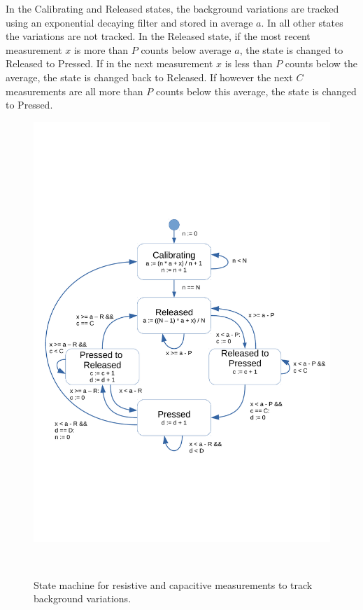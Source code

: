 \documentclass{sigchi-ext}
\begin{document}
In the Calibrating and Released states, the background variations are tracked
using an exponential decaying filter and stored in average $a$. In all other
states the variations are not tracked. In the Released state, if the
most recent measurement $x$ is more than $P$ counts below average $a$, the state
is changed to Released to Pressed. If in the next measurement $x$ is less
than $P$ counts below the average, the state is changed back to Released. If
however the next $C$ measurements are all more than $P$ counts below this
average, the state is changed to Pressed.

\begin{figure}
\centering
\includegraphics[trim={0 6.2cm 0 6.8cm},clip,width=0.9\columnwidth]{figures/state_machine}
 \caption{State machine for resistive and capacitive measurements to track
background variations.}~\label{fig:state_machine}
\end{figure}
\end{document}
